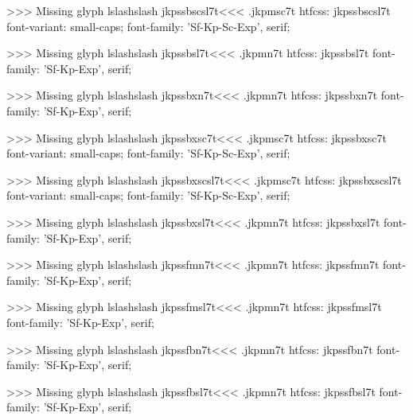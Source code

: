 >>>
Missing glyph	lslashslash
\<jkpssbscsl7t\><<<
.jkpmsc7t
htfcss:  jkpssbscsl7t  font-variant: small-caps; font-family: 'Sf-Kp-Sc-Exp', serif;

>>>
Missing glyph	lslashslash
\<jkpssbsl7t\><<<
.jkpmn7t
htfcss:  jkpssbsl7t  font-family: 'Sf-Kp-Exp', serif;

>>>
Missing glyph	lslashslash
\<jkpssbxn7t\><<<
.jkpmn7t
htfcss:  jkpssbxn7t  font-family: 'Sf-Kp-Exp', serif;

>>>
Missing glyph	lslashslash
\<jkpssbxsc7t\><<<
.jkpmsc7t
htfcss:  jkpssbxsc7t  font-variant: small-caps; font-family: 'Sf-Kp-Sc-Exp', serif;

>>>
Missing glyph	lslashslash
\<jkpssbxscsl7t\><<<
.jkpmsc7t
htfcss:  jkpssbxscsl7t  font-variant: small-caps; font-family: 'Sf-Kp-Sc-Exp', serif;

>>>
Missing glyph	lslashslash
\<jkpssbxsl7t\><<<
.jkpmn7t
htfcss:  jkpssbxsl7t  font-family: 'Sf-Kp-Exp', serif;

>>>
Missing glyph	lslashslash
\<jkpssfmn7t\><<<
.jkpmn7t
htfcss:  jkpssfmn7t  font-family: 'Sf-Kp-Exp', serif;

>>>
Missing glyph	lslashslash
\<jkpssfmsl7t\><<<
.jkpmn7t
htfcss:  jkpssfmsl7t  font-family: 'Sf-Kp-Exp', serif;

>>>
Missing glyph	lslashslash
\<jkpssfbn7t\><<<
.jkpmn7t
htfcss:  jkpssfbn7t  font-family: 'Sf-Kp-Exp', serif;

>>>
Missing glyph	lslashslash
\<jkpssfbsl7t\><<<
.jkpmn7t
htfcss:  jkpssfbsl7t  font-family: 'Sf-Kp-Exp', serif;

